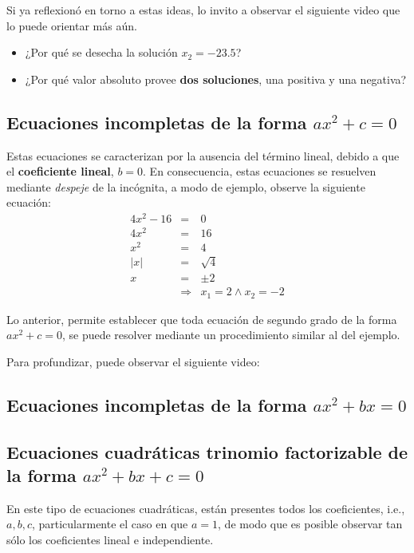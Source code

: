 \documentclass[12pt,letterpaper,article,x11names]{memoir}
\begin{document}
Si ya reflexionó en torno a estas ideas, lo invito a observar el siguiente video que lo puede orientar más aún.

\begin{itemize}
\item ¿Por qué se desecha la solución \(x_2=-23.5\)?
\item ¿Por qué valor absoluto provee \textbf{dos soluciones}, una positiva y una negativa?
\end{itemize}

\subsection{Ecuaciones incompletas de la forma \(ax^2+c=0\)}
\label{sec:org85d63ab}
Estas ecuaciones se caracterizan por la ausencia del término lineal, debido a que el \textbf{coeficiente lineal}, \(b=0\).
En consecuencia, estas ecuaciones se resuelven mediante \emph{despeje} de la incógnita, a modo de ejemplo, observe la siguiente ecuación:
\begin{eqnarray*}
  4x^{2}-16&=&0\\
  4x^{2}&=&16\\
  x^{2}&=&4\\
  |x|&=&\sqrt{4}\\
  x&=&\pm2\\
   &\Rightarrow&x_1=2\wedge x_2=-2
\end{eqnarray*}

Lo anterior, permite establecer que toda ecuación de segundo grado de la forma \(ax^2+c=0\), se puede resolver mediante un procedimiento similar al del ejemplo.

Para profundizar, puede observar el siguiente video:

\subsection{Ecuaciones incompletas de la forma \(ax^2+bx=0\)}
\label{sec:orgc3a2384}

\subsection{Ecuaciones cuadráticas trinomio factorizable de la forma \(ax^2+bx+c=0\)}
\label{sec:org546daaa}
En este tipo de ecuaciones cuadráticas, están presentes todos los coeficientes, i.e., \(a,b,c\), particularmente el caso en que \(a=1\), de modo que es posible observar tan sólo los coeficientes lineal e independiente.
\end{document}
